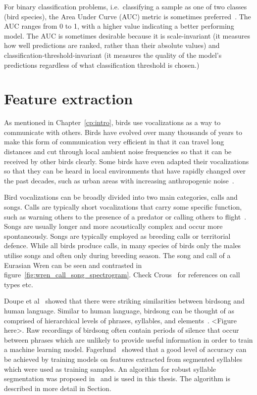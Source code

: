 For binary classification problems, i.e.\ classifying a sample as one of two
classes (bird species), the Area Under Curve (AUC) metric is sometimes
preferred~\cite{leng2014multi}. The AUC ranges from 0 to 1, with a higher value
indicating a better performing model. The AUC is sometimes desirable because it
is scale-invariant (it measures how well predictions are ranked, rather than
their absolute values) and classification-threshold-invariant (it measures the
quality of the model's predictions regardless of what classification threshold
is chosen.)

\section{Feature extraction}

As mentioned in Chapter~\ref{cp:intro}, birds use vocalizations as a way to
communicate with others. Birds have evolved over many thousands of years to
make this form of communication very efficient in that it can travel long
distances and cut through local ambient noise frequencies so that it can be
received by other birds clearly. Some birds have even adapted their
vocalizations so that they can be heard in local environments that have rapidly
changed over the past decades, such as urban areas with increasing anthropogenic
noise~\cite{luther2010urban}.

Bird vocalizations can be broadly divided into two main categories, calls and
songs. Calls are typically short vocalizations that carry some specific
function, such as warning others to the presence of a predator or calling others
to flight~\cite{MARLER2004132}. Songs are usually longer and more acoustically
complex and occur more spontaneously. Songs are typically employed as breeding
calls or territorial defence. While all birds produce calls, in many species of
birds only the males utilise songs and often only during breeding season. The
song and call of a Eurasian Wren can be seen and contrasted in
figure~\ref{fig:wren_call_song_spectrogram}.
Check Crous~\cite{crous2019polyphonic} for references on call types etc.

Doupe et al~\cite{birdsongspeech} showed that there were striking similarities
between birdsong and human language. Similar to human language, birdsong can be
thought of as comprised of hierarchical levels of phrases, syllables, and
elements~\cite{catchpole2003bird}. <Figure here>. Raw recordings of birdsong
often contain periods of silence that occur between phrases which are unlikely
to provide useful information in order to train a machine learning model.
Fagerlund~\cite{fagerlund2007bird} showed that a good level of accuracy can be
achieved by training models on features extracted from segmented syllables which
were used as training samples. An algorithm for robust syllable segmentation was
proposed in~\cite{fagerlund2004automatic} and is used in this thesis. The
algorithm is described in more detail in Section.

